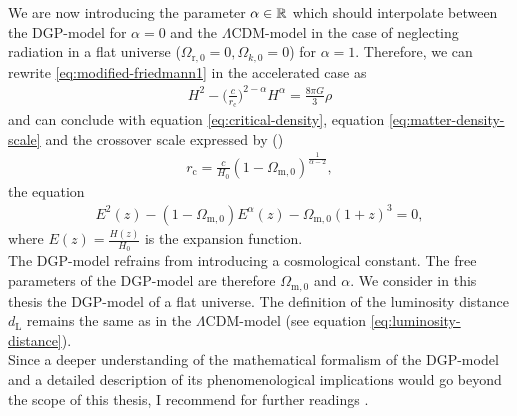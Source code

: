 \noindent We are now introducing the parameter $\alpha \in \mathbb{R}$ which should interpolate between the DGP-model for $\alpha = 0$ and the $\Lambda$CDM-model in the case of neglecting radiation in a flat universe ($\Omega_{\text{r},0} = 0, \Omega_{k,0} = 0$) for $\alpha = 1$. Therefore, we can rewrite \eqref{eq:modified-friedmann1} in the accelerated case as 
\begin{align}
    H^{2} - \biggl(\frac{c}{r_{\text{c}}} \biggr)^{2 - \alpha} H^{\alpha} = \frac{8 \pi G}{3} \rho
\end{align}
and can conclude with equation \eqref{eq:critical-density}, equation \eqref{eq:matter-density-scale} and the crossover scale expressed by (\cite[p.~3]{Dvali2003})
\begin{align}
    r_{\text{c}} = \frac{c}{H_{0}}(1 - \Omega_{\text{m},0})^{\frac{1}{\alpha - 2}}, 
\end{align}
the equation 
\begin{align}
    E^{2}(z) - (1 - \Omega_{\text{m},0}) E^{\alpha}(z) - \Omega_{\text{m},0} (1 + z)^3 = 0, \label{eq:dgp-friedmann-interpolation} 
\end{align}
where $E(z) = \frac{H(z)}{H_{0}}$ is the expansion function. \\

\noindent The DGP-model refrains from introducing a cosmological constant. The free parameters of the DGP-model are therefore $\Omega_{\text{m},0}$ and $\alpha$.
We consider in this thesis the DGP-model of a flat universe. The definition of the luminosity distance $d_{\text{L}}$ remains the same as in the $\Lambda$CDM-model (see equation \eqref{eq:luminosity-distance}). \\
Since a deeper understanding of the mathematical formalism of the DGP-model and a detailed description of its phenomenological implications would go beyond the scope of this thesis, I recommend for further readings \cite{Lue2006}.
